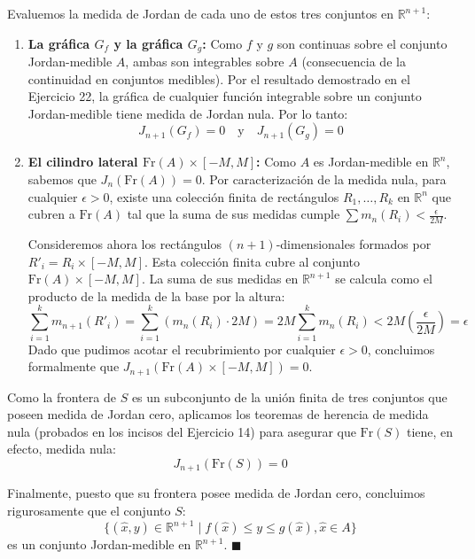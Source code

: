 \documentclass[11pt,letterpaper]{article}
\begin{document}
Evaluemos la medida de Jordan de cada uno de estos tres conjuntos en $\mathbb{R}^{n+1}$:
\begin{enumerate}
    \item \textbf{La gráfica $G_f$ y la gráfica $G_g$:} Como $f$ y $g$ son continuas sobre el conjunto Jordan-medible $A$, ambas son integrables sobre $A$ (consecuencia de la continuidad en conjuntos medibles). Por el resultado demostrado en el Ejercicio 22, la gráfica de cualquier función integrable sobre un conjunto Jordan-medible tiene medida de Jordan nula. Por lo tanto:
    \begin{equation*}
    J_{n+1}(G_f) = 0 \quad \text{y} \quad J_{n+1}(G_g) = 0
    \end{equation*}
    
    \item \textbf{El cilindro lateral $\text{Fr}(A) \times [-M, M]$:} Como $A$ es Jordan-medible en $\mathbb{R}^n$, sabemos que $J_n(\text{Fr}(A)) = 0$. Por caracterización de la medida nula, para cualquier $\epsilon > 0$, existe una colección finita de rectángulos $R_1, \dots, R_k$ en $\mathbb{R}^n$ que cubren a $\text{Fr}(A)$ tal que la suma de sus medidas cumple $\sum m_n(R_i) < \frac{\epsilon}{2M}$. 
    
    Consideremos ahora los rectángulos $(n+1)$-dimensionales formados por $R'_i = R_i \times [-M, M]$. Esta colección finita cubre al conjunto $\text{Fr}(A) \times [-M, M]$. La suma de sus medidas en $\mathbb{R}^{n+1}$ se calcula como el producto de la medida de la base por la altura:
    \begin{equation*}
    \sum_{i=1}^{k} m_{n+1}(R'_i) = \sum_{i=1}^{k} \left( m_n(R_i) \cdot 2M \right) = 2M \sum_{i=1}^{k} m_n(R_i) < 2M \left( \frac{\epsilon}{2M} \right) = \epsilon
    \end{equation*}
    Dado que pudimos acotar el recubrimiento por cualquier $\epsilon > 0$, concluimos formalmente que $J_{n+1}(\text{Fr}(A) \times [-M, M]) = 0$.
\end{enumerate}

Como la frontera de $S$ es un subconjunto de la unión finita de tres conjuntos que poseen medida de Jordan cero, aplicamos los teoremas de herencia de medida nula (probados en los incisos del Ejercicio 14) para asegurar que $\text{Fr}(S)$ tiene, en efecto, medida nula:
\begin{equation*}
J_{n+1}(\text{Fr}(S)) = 0
\end{equation*}

Finalmente, puesto que su frontera posee medida de Jordan cero, concluimos rigurosamente que el conjunto $S$:
\begin{equation*}
\{(\hat{x}, y) \in \mathbb{R}^{n+1} \mid f(\hat{x}) \le y \le g(\hat{x}), \hat{x} \in A\}
\end{equation*}
es un conjunto Jordan-medible en $\mathbb{R}^{n+1}$. \hfill $\blacksquare$
\end{document}
